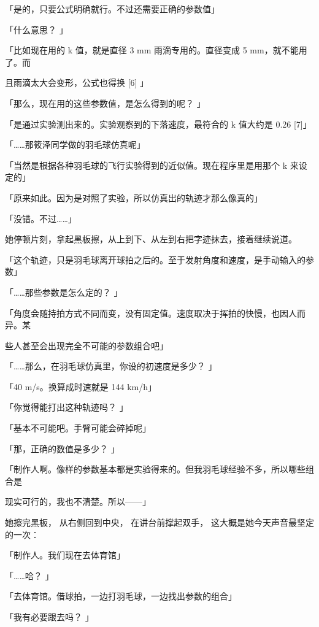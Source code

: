 「是的，只要公式明确就行。不过还需要正确的参数值」\par
「什么意思？ 」\par
「比如现在用的 k 值，就是直径 3 mm 雨滴专用的。直径变成 5 mm，就不能用了。而\par
且雨滴太大会变形，公式也得换 [6] 」\par
「那么，现在用的这些参数值，是怎么得到的呢？ 」\par
「是通过实验测出来的。实验观察到的下落速度，最符合的 k 值大约是 0.26 [7]」\par
「……那筱泽同学做的羽毛球仿真呢」\par
「当然是根据各种羽毛球的飞行实验得到的近似值。现在程序里是用那个 k 来设定的」\par
「原来如此。因为是对照了实验，所以仿真出的轨迹才那么像真的」\par
「没错。不过……」\par
她停顿片刻，拿起黑板擦，从上到下、从左到右把字迹抹去，接着继续说道。\par
「这个轨迹，只是羽毛球离开球拍之后的。至于发射角度和速度，是手动输入的参数」\par
「……那些参数是怎么定的？ 」\par
「角度会随持拍方式不同而变，没有固定值。速度取决于挥拍的快慢，也因人而异。某\par
些人甚至会出现完全不可能的参数组合吧」\par
「……那么，在羽毛球仿真里，你设的初速度是多少？ 」\par
「40 m/s。换算成时速就是 144 km/h」\par
「你觉得能打出这种轨迹吗？ 」\par
「基本不可能吧。手臂可能会碎掉呢」\par
「那，正确的数值是多少？ 」\par
「制作人啊。像样的参数基本都是实验得来的。但我羽毛球经验不多，所以哪些组合是\par
现实可行的，我也不清楚。所以——」\par
她擦完黑板， 从右侧回到中央， 在讲台前撑起双手， 这大概是她今天声音最坚定的一次：\par
「制作人。我们现在去体育馆」\par
「……哈？ 」\par
「去体育馆。借球拍，一边打羽毛球，一边找出参数的组合」\par
「我有必要跟去吗？ 」\par


